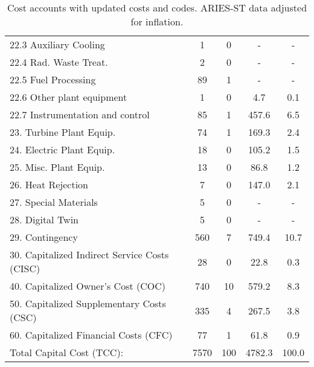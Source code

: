 \begin{table}[h!]
{\begin{tabular}{lcccc}
\hspace{10mm}22.3 Auxiliary Cooling & 1 & 0 & - & - \\
\hspace{10mm}22.4 Rad. Waste Treat. & 2 & 0 & - & - \\
\hspace{10mm}22.5 Fuel Processing & 89 & 1 & - & - \\
\hspace{10mm}22.6 Other plant equipment & 1 & 0 & 4.7 & 0.1 \\
\hspace{10mm}22.7 Instrumentation and control & 85 & 1 & 457.6 & 6.5 \\
\hspace{5mm}23. Turbine Plant Equip. & 74 & 1 & 169.3 & 2.4 \\
\hspace{5mm}24. Electric Plant Equip. & 18 & 0 & 105.2 & 1.5 \\
\hspace{5mm}25. Misc. Plant Equip. & 13 & 0 & 86.8 & 1.2 \\
\hspace{5mm}26. Heat Rejection & 7 & 0 & 147.0 & 2.1 \\
\hspace{5mm}27. Special Materials & 5 & 0 & - & - \\
\hspace{5mm}28. Digital Twin & 5 & 0 & - & - \\
\hspace{5mm}29. Contingency & 560 & 7 & 749.4 & 10.7 \\
30. Capitalized Indirect Service Costs (CISC) & 28 & 0 & 22.8 & 0.3 \\
40. Capitalized Owner’s Cost (COC) & 740 & 10 & 579.2 & 8.3 \\
50. Capitalized Supplementary Costs (CSC) & 335 & 4 & 267.5 & 3.8 \\
60. Capitalized Financial Costs (CFC) & 77 & 1 & 61.8 & 0.9 \\
\hline
Total Capital Cost (TCC): & 7570 & 100 & 4782.3 & 100.0 \\
\hline
\end{tabular}
}
\caption{Cost accounts with updated costs and codes. ARIES-ST data adjusted for inflation.}
\label{tab:costs_updated_codes}
\end{table}


